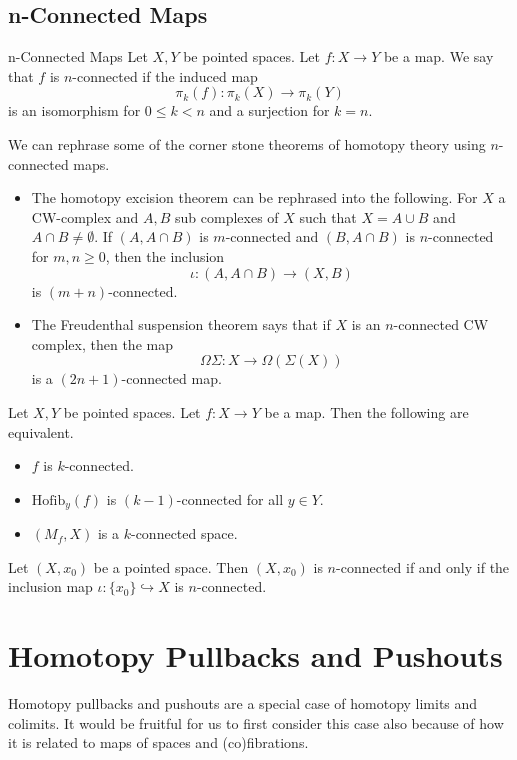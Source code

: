 \documentclass[a4paper]{article}
\begin{document}
\subsection{n-Connected Maps}
\begin{defn}{n-Connected Maps}{} Let $X,Y$ be pointed spaces. Let $f:X\to Y$ be a map. We say that $f$ is $n$-connected if the induced map $$\pi_k(f):\pi_k(X)\to\pi_k(Y)$$ is an isomorphism for $0\leq k<n$ and a surjection for $k=n$. 
\end{defn}

We can rephrase some of the corner stone theorems of homotopy theory using $n$-connected maps. 
\begin{itemize}
\item The homotopy excision theorem can be rephrased into the following. For $X$ a CW-complex and $A,B$ sub complexes of $X$ such that $X=A\cup B$ and $A\cap B\neq\emptyset$. If $(A,A\cap B)$ is $m$-connected and $(B,A\cap B)$ is $n$-connected for $m,n\geq 0$, then the inclusion $$\iota:(A,A\cap B)\to(X,B)$$ is $(m+n)$-connected. 
\item The Freudenthal suspension theorem says that if $X$ is an $n$-connected CW complex, then the map $$\Omega\Sigma:X\to\Omega(\Sigma(X))$$ is a $(2n+1)$-connected map. 
\end{itemize}

\begin{prp}{}{} Let $X,Y$ be pointed spaces. Let $f:X\to Y$ be a map. Then the following are equivalent. 
\begin{itemize}
\item $f$ is $k$-connected. 
\item $\text{Hofib}_y(f)$ is $(k-1)$-connected for all $y\in Y$. 
\item $(M_f,X)$ is a $k$-connected space. 
\end{itemize}
\end{prp}

\begin{lmm}{}{} Let $(X,x_0)$ be a pointed space. Then $(X,x_0)$ is $n$-connected if and only if the inclusion map $\iota:\{x_0\}\hookrightarrow X$ is $n$-connected. 
\end{lmm}

\pagebreak
\section{Homotopy Pullbacks and Pushouts}
Homotopy pullbacks and pushouts are a special case of homotopy limits and colimits. It would be fruitful for us to first consider this case also because of how it is related to maps of spaces and (co)fibrations. 
\end{document}
